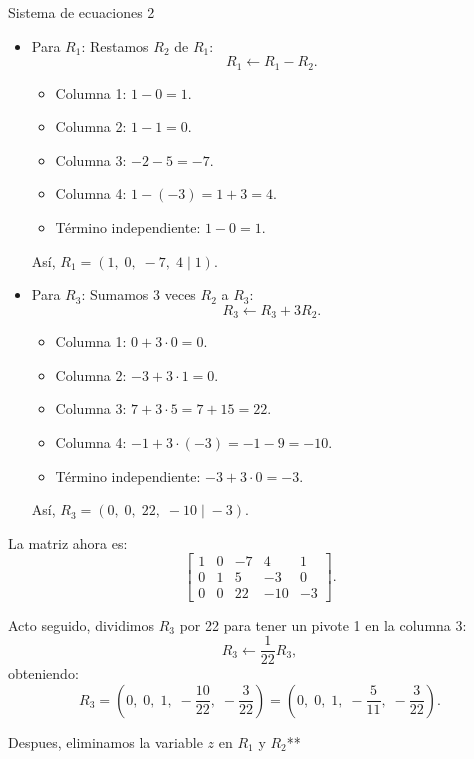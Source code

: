 \documentclass[11pt,letterpaper]{article}
\begin{document}
\begin{inciso}{Sistema de ecuaciones 2}
\begin{itemize}
     
    \item Para \(R_1\):  
      Restamos \(R_2\) de \(R_1\):
      \[
      R_1 \leftarrow R_1 - R_2.
      \]
\begin{itemize}
    \item Columna 1: \(1 - 0 = 1\).
    \item Columna 2: \(1 - 1 = 0\).
    \item Columna 3: \(-2 - 5 = -7\).
    \item Columna 4: \(1 - (-3) = 1 + 3 = 4\).
    \item Término independiente: \(1 - 0 = 1\).
\end{itemize}

    
      Así, \(R_1 = (1,\;0,\;-7,\;4 \;|\;1)\).
    
    \item Para \(R_3\):  
      Sumamos 3 veces \(R_2\) a \(R_3\):
      \[
      R_3 \leftarrow R_3 + 3R_2.
      \]
\begin{itemize}
    \item Columna 1: \(0 + 3\cdot0 = 0\).
    \item Columna 2: \(-3 + 3\cdot1 = 0\).
    \item Columna 3: \(7 + 3\cdot5 = 7 + 15 = 22\).
    \item Columna 4: \(-1 + 3\cdot(-3) = -1 - 9 = -10\).
    \item Término independiente: \(-3 + 3\cdot0 = -3\).
\end{itemize}

    
      Así, \(R_3 = (0,\;0,\;22,\;-10 \;|\;-3)\).
\end{itemize}

La matriz ahora es:
\[
\left[\begin{array}{cccc|c}
1 & 0 & -7 & 4 & 1 \\
0 & 1 & 5 & -3 & 0 \\
0 & 0 & 22 & -10 & -3
\end{array}\right].
\]

Acto seguido, dividimos \(R_3\) por 22 para tener un pivote 1 en la columna 3:
\[
R_3 \leftarrow \frac{1}{22}R_3,
\]
obteniendo:
\[
R_3 = \left(0,\;0,\;1,\;-\frac{10}{22},\; -\frac{3}{22}\right) = \left(0,\;0,\;1,\;-\frac{5}{11},\; -\frac{3}{22}\right).
\]

Despues, eliminamos la variable \(z\) en \(R_1\) y \(R_2\)**


\end{inciso}
\end{document}
